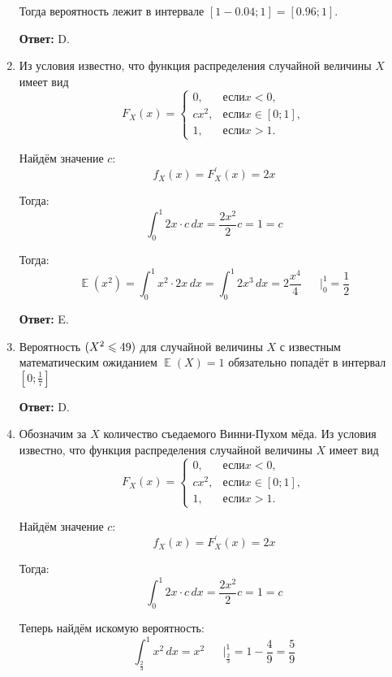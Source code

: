 \documentclass[a4paper]{article} %
\DeclareMathOperator{\E}{\mathbb{E}}
\let\P\relax
\DeclareMathOperator{\P}{\mathbb{P}}
\renewcommand{\le}{\leqslant}
\begin{document}
\begin{enumerate}
    Тогда вероятность лежит в интервале $[1 - 0.04; 1] = [0.96; 1]$.
    
    \textbf{Ответ:} D.
    
    
    \item
    Из условия известно, что функция распределения случайной величины $X$ имеет вид
    \[
    F_{X}(x) =
    \begin{cases}
    0, & \text{если} x < 0, \\
    cx^{2}, & \text{если} x \in [0; 1], \\
    1, & \text{если} x > 1.
    \end{cases}
    \]
    
    Найдём значение $c$:
    \[
    f_{X}(x) = F_{X}^{'}(x) = 2x
    \]
    
    Тогда:
    \[
    \int_{0}^{1} 2x \cdot c \,dx = \frac{2x^{2}}{2} c = 1 = c
    \]
    
    Тогда:
    \[
    \E(x^{2}) = \int_{0}^{1} x^{2} \cdot 2x \,dx = \int_{0}^{1} 2x^{3} \,dx = 2 \frac{x^{4}}{4} \left.\begin{matrix} & \\ & \end{matrix}\right|_{0}^{1} = \frac{1}{2}
    \]
    
    \textbf{Ответ:} E.
    
    
    \item
    Вероятность $\P(X^{2} \le 49)$ для случайной величины $X$ с известным математическим ожиданием $\E(X) = 1$ обязательно попадёт в интервал $\left[0; \frac{1}{7} \right]$
    
    \textbf{Ответ:} D.
    
    
    \item
    Обозначим за $X$ количество съедаемого Винни-Пухом мёда.
    Из условия известно, что функция распределения случайной величины $X$ имеет вид
    \[
    F_{X}(x) =
    \begin{cases}
    0, & \text{если} x < 0, \\
    cx^{2}, & \text{если} x \in [0; 1], \\
    1, & \text{если} x > 1.
    \end{cases}
    \]
    
    Найдём значение $c$:
    \[
    f_{X}(x) = F_{X}^{'}(x) = 2x
    \]
    
    Тогда:
    \[
    \int_{0}^{1} 2x \cdot c \,dx = \frac{2x^{2}}{2} c = 1 = c
    \]
    
    Теперь найдём искомую вероятность:
    \[
    \int_{\frac{2}{3}}^{1} x^{2} \,dx = x^{2} \left.\begin{matrix} & \\ & \end{matrix}\right|_{\frac{2}{3}}^{1} = 1 - \frac{4}{9} = \frac{5}{9}
    \]
    

\end{enumerate}
\end{document}
